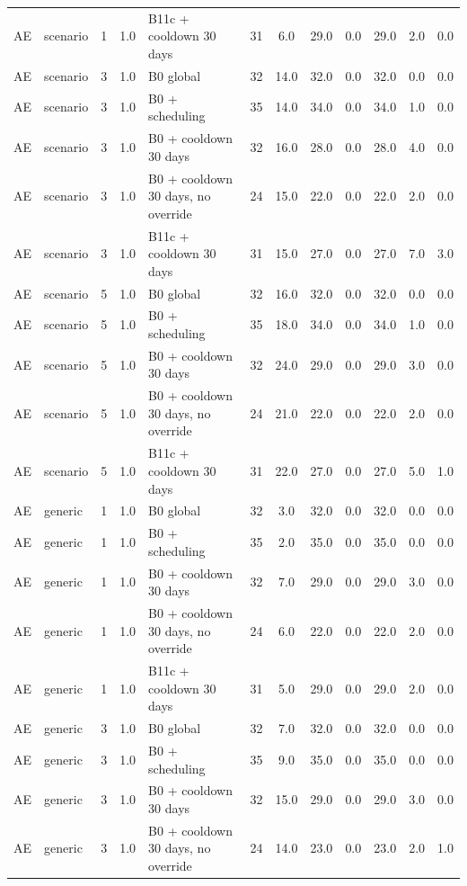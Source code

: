 \begin{longtable}{lllllccccccc}
AE & scenario & 1 & 1.0 & B11c + cooldown 30 days & 31 & 6.0 & 29.0 & 0.0 & 29.0 & 2.0 & 0.0 \\
AE & scenario & 3 & 1.0 & B0 global & 32 & 14.0 & 32.0 & 0.0 & 32.0 & 0.0 & 0.0 \\
AE & scenario & 3 & 1.0 & B0 + scheduling & 35 & 14.0 & 34.0 & 0.0 & 34.0 & 1.0 & 0.0 \\
AE & scenario & 3 & 1.0 & B0 + cooldown 30 days & 32 & 16.0 & 28.0 & 0.0 & 28.0 & 4.0 & 0.0 \\
AE & scenario & 3 & 1.0 & B0 + cooldown 30 days, no override & 24 & 15.0 & 22.0 & 0.0 & 22.0 & 2.0 & 0.0 \\
AE & scenario & 3 & 1.0 & B11c + cooldown 30 days & 31 & 15.0 & 27.0 & 0.0 & 27.0 & 7.0 & 3.0 \\
AE & scenario & 5 & 1.0 & B0 global & 32 & 16.0 & 32.0 & 0.0 & 32.0 & 0.0 & 0.0 \\
AE & scenario & 5 & 1.0 & B0 + scheduling & 35 & 18.0 & 34.0 & 0.0 & 34.0 & 1.0 & 0.0 \\
AE & scenario & 5 & 1.0 & B0 + cooldown 30 days & 32 & 24.0 & 29.0 & 0.0 & 29.0 & 3.0 & 0.0 \\
AE & scenario & 5 & 1.0 & B0 + cooldown 30 days, no override & 24 & 21.0 & 22.0 & 0.0 & 22.0 & 2.0 & 0.0 \\
AE & scenario & 5 & 1.0 & B11c + cooldown 30 days & 31 & 22.0 & 27.0 & 0.0 & 27.0 & 5.0 & 1.0 \\
AE & generic & 1 & 1.0 & B0 global & 32 & 3.0 & 32.0 & 0.0 & 32.0 & 0.0 & 0.0 \\
AE & generic & 1 & 1.0 & B0 + scheduling & 35 & 2.0 & 35.0 & 0.0 & 35.0 & 0.0 & 0.0 \\
AE & generic & 1 & 1.0 & B0 + cooldown 30 days & 32 & 7.0 & 29.0 & 0.0 & 29.0 & 3.0 & 0.0 \\
AE & generic & 1 & 1.0 & B0 + cooldown 30 days, no override & 24 & 6.0 & 22.0 & 0.0 & 22.0 & 2.0 & 0.0 \\
AE & generic & 1 & 1.0 & B11c + cooldown 30 days & 31 & 5.0 & 29.0 & 0.0 & 29.0 & 2.0 & 0.0 \\
AE & generic & 3 & 1.0 & B0 global & 32 & 7.0 & 32.0 & 0.0 & 32.0 & 0.0 & 0.0 \\
AE & generic & 3 & 1.0 & B0 + scheduling & 35 & 9.0 & 35.0 & 0.0 & 35.0 & 0.0 & 0.0 \\
AE & generic & 3 & 1.0 & B0 + cooldown 30 days & 32 & 15.0 & 29.0 & 0.0 & 29.0 & 3.0 & 0.0 \\
AE & generic & 3 & 1.0 & B0 + cooldown 30 days, no override & 24 & 14.0 & 23.0 & 0.0 & 23.0 & 2.0 & 1.0 \\

\end{longtable}

